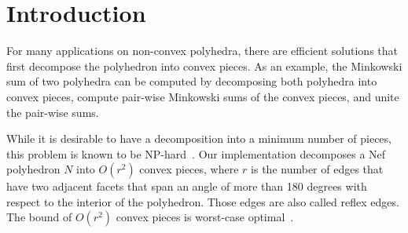 
\ccParDims




\section{Introduction}

For many applications on non-convex polyhedra, there are efficient
solutions that first decompose the polyhedron into convex pieces. As
an example, the Minkowski sum of two polyhedra can be computed by
decomposing both polyhedra into convex pieces, compute pair-wise
Minkowski sums of the convex pieces, and unite the pair-wise sums.

While it is desirable to have a decomposition into a minimum number of
pieces, this problem is known to be NP-hard~\cite{c-cpplb-84}. Our
implementation decomposes a Nef polyhedron $N$ into $O(r^2)$ convex
pieces, where $r$ is the number of edges that have two adjacent
facets that span an angle of more than 180 degrees with respect to the
interior of the polyhedron. Those edges are also called reflex edges.
The bound of $O(r^2)$ convex pieces is worst-case
optimal~\cite{c-cpplb-84}.

